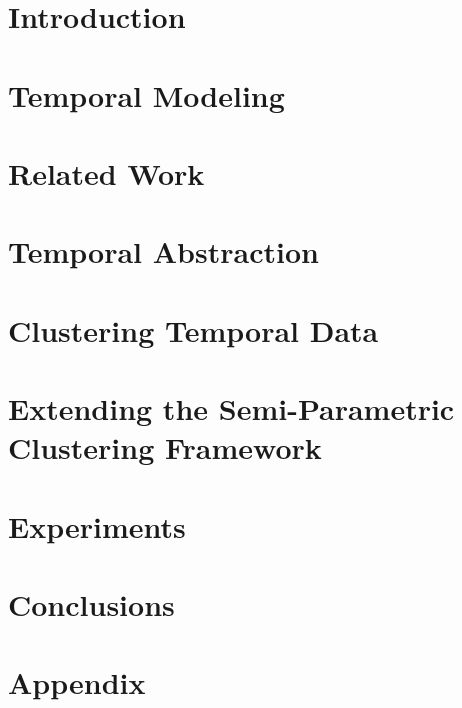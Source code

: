 \documentclass[letterpaper,12pt]{report}
\begin{document}
\doublespacing

\tableofcontents
\cleardoublepage
\listoffigures
\cleardoublepage
\listoftables
\cleardoublepage



\newpage
{}

\chapter{Introduction}
\label{ch:intro}


\chapter{Temporal Modeling}
\label{ch:temporal_dynamics}


\chapter{Related Work}
\label{ch:related}


\chapter{Temporal Abstraction}
\label{ch:abstraction}


\chapter{Clustering Temporal Data}
\label{ch:clustering}


\chapter{Extending the Semi-Parametric Clustering Framework}
\label{ch:new}


\chapter{Experiments}
\label{ch:expts}


\chapter{Conclusions}
\label{ch:conclusions}





\appendix
\chapter{Appendix}

\end{document}
